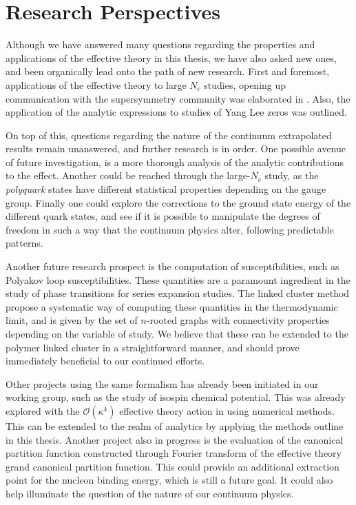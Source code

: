 \chapter{Research Perspectives}

Although we have answered many questions regarding the properties and
applications of the effective theory in this thesis, we have also asked new
ones, and been organically lead onto the path of new research. First and
foremost, applications of the effective theory to large $N_c$ studies, opening
up communication with the supersymmetry community was elaborated in
. Also, the application of the analytic expressions
to studies of Yang Lee zeros was outlined.

On top of this, questions regarding the nature of the continuum extrapolated
results remain unanswered, and further research is in order. One possible avenue
of future investigation, is a more thorough analysis of the analytic
contributions to the effect. Another could be reached through the large-$N_c$
study, as the \emph{polyquark} states have different statistical properties
depending on the gauge group. Finally one could explore the corrections to the
ground state energy of the different quark states, and see if it is possible to
manipulate the degrees of freedom in such a way that the continuum physics
alter, following predictable patterns.

Another future research prospect is the computation of susceptibilities, such as
Polyakov loop susceptibilities. These quantities are a paramount ingredient in
the study of phase transitions for series expansion studies. The linked cluster
method propose a systematic way of computing these quantities in the
thermodynamic limit, and is given by the set of $n$-rooted graphs with
connectivity properties depending on the variable of study. We believe that
these can be extended to the polymer linked cluster in a straightforward manner,
and should prove immediately beneficial to our continued efforts.

Other projects using the same formalism has already been initiated in our
working group, such as the study of isospin chemical potential. This was already
explored with the $\mathcal{O}(\kappa^4)$ effective theory action in
\citep{Langelage:2014vpa} using numerical methods. This can be extended to the
realm of analytics by applying the methods outline in this thesis. Another
project also in progress is the evaluation of the canonical partition function
constructed through Fourier transform of the effective theory grand canonical
partition function. This could provide an additional extraction point for the
nucleon binding energy, which is still a future goal. It could also help
illuminate the question of the nature of our continuum physics.

